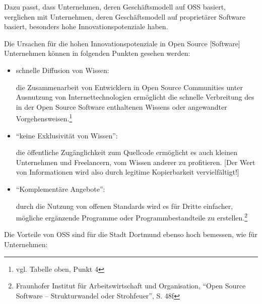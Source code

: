 \documentclass[a4paper]{scrartcl}
\begin{document}
Dazu passt, dass Unternehmen, deren Geschäftsmodell auf OSS basiert, verglichen
mit Unternehmen, deren Geschäftsmodell auf proprietärer Software basiert,
besonders hohe Innovationspotenziale haben.

Die Ursachen für die hohen Innovationspotenziale in Open Source
  [Software] Unternehmen können in folgenden Punkten gesehen werden:

\begin{itemize}
\item schnelle Diffusion von Wissen:

die Zusammenarbeit von Entwicklern in Open Source Communities unter
Ausnutzung von Internettechnologien ermöglicht die schnelle
Verbreitung des in der Open Source Software enthaltenen Wissens oder
angewandter Vorgehensweisen.\footnote{vgl. Tabelle oben, Punkt 4}

\item ``keine Exklusivität von Wissen'':

  die öffentliche Zugänglichkeit zum Quellcode ermöglicht es auch kleinen
  Unternehmen und Freelancern, vom Wissen anderer zu profitieren.  [Der Wert von
  Informationen wird also durch legitime Kopierbarkeit vervielfältigt!]

\item ``Komplementäre Angebote'':

  durch die Nutzung von offenen Standards wird es für Dritte einfacher, mögliche
  ergänzende Programme oder Programmbestandteile zu
  erstellen.\footnote{Fraunhofer Institut für Arbeitswirtschaft und
  Organisation, ``Open Source Software -- Strukturwandel oder Strohfeuer'',
  S. 48f}
\end{itemize}

Die Vorteile von OSS sind für die Stadt Dortmund ebenso hoch bemessen, wie für
Unternehmen:
\end{document}
